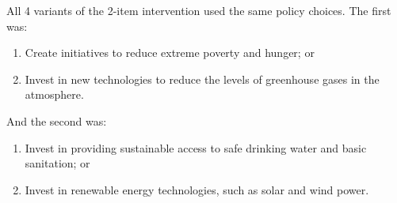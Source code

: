 All 4 variants of the 2-item intervention used the same policy choices. The
first was:
\begin{enumerate}
    \item Create initiatives to reduce extreme poverty and hunger; or
    \item Invest in new technologies to reduce the levels of greenhouse gases in the atmosphere.
\end{enumerate}
And the second was:
\begin{enumerate}
    \item Invest in providing sustainable access to safe drinking water and basic sanitation; or
    \item Invest in renewable energy technologies, such as solar and wind power.
\end{enumerate}
